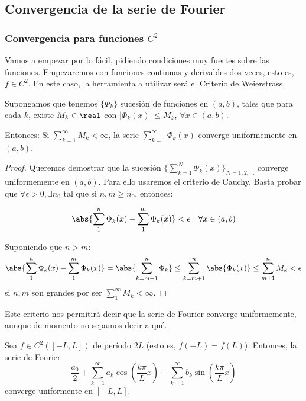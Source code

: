 	\subsection{Convergencia de la serie de Fourier}

		\subsubsection{Convergencia para funciones $C^2$}

		Vamos a empezar por lo fácil, pidiendo condiciones muy fuertes sobre las funciones. Empezaremos con funciones continuas y derivables dos veces, esto es, $f ∈ C^2$. En este caso, la herramienta a utilizar será el Criterio de Weierstrass.

		\begin{prop}\label{prop:criterio_Weierstrass} Supongamos que tenemos $\{\Phi_k\}$ sucesión de funciones en $(a,b)$, tales que para cada $k$, existe $M_k \in \real$ con $|\Phi_k(x)| \leq M_k$, $\forall x \in (a,b)$.

		Entonces: Si $\sum\limits_{k=1}^{\infty} M_k < \infty$, la serie $\sum\limits_{k=1}^{\infty} \Phi_k(x) $ converge uniformemente en $(a,b)$.
		\end{prop}

		\begin{proof}
			Queremos demostrar que la sucesión $\{\sum\limits_{k=1}^{N} \Phi_k(x)\}_{N=1,2,…} $ converge uniformemente en $(a,b)$. Para ello usaremos el criterio de Cauchy. Basta probar que $\forall \epsilon > 0, \exists n_0 $ tal que si $n,m \geq n_0 $, entonces:

			\[ \abs{\sum^n_1 \Phi_k(x) - \sum^m_1 \Phi_k(x)} < \epsilon \quad \forall x \in (a,b) \]

			Suponiendo que $n > m$:
			\[ \abs{\sum^{n}_1 \Phi_k (x) - \sum^{m}_1 \Phi_k (x)} = \abs{\sum^n_{k=m+1} \Phi_k} \leq \sum^n_{k=m+1} \abs{\Phi_k (x)} \leq \sum_{m+1}^n M_k < \epsilon\]
			si $n,m$ son grandes por ser  $\sum\limits_{1}^{\infty} M_k < \infty $.
		\end{proof}

		Este criterio nos permitirá decir que la serie de Fourier converge uniformemente, aunque de momento no sepamos decir a qué.

		\begin{prop} \label{prop:ConvergenciaUniformeFourier} Sea $f \in C^2 ([-L, L])$ de período $2L$ (esto es, $f(-L) = f(L)$). Entonces, la serie de Fourier \[ \frac{a_0}{2} + \sum_{k=1}^\infty a_k \cos \left( \frac{k \pi}{L} x \right) + \sum_{k=1}^\infty b_k \sin \left( \frac{k \pi}{L} x \right) \] converge uniformente en $[-L, L]$.
		\end{prop}

